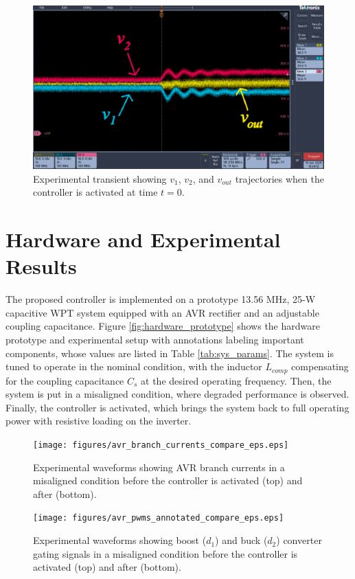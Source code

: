 \documentclass[conference, twocolumn, letterpaper]{IEEEtran}
\begin{document}
\begin{figure}[h]
	\centering
	\includegraphics[width=\linewidth]{figures/avr_voltage_transient_annotated_eps.eps}
	\caption{Experimental transient showing $v_1$, $v_2$, and $v_{out}$ trajectories when the controller is activated at time $t = 0$.}
	\label{fig:voltage_transient}
\end{figure}

\section{Hardware and Experimental Results}
\label{sec:hardware}

The proposed controller is implemented on a prototype 13.56 MHz, 25-W capacitive WPT system equipped with an AVR rectifier and an adjustable coupling capacitance. Figure \ref{fig:hardware_prototype} shows the hardware prototype and experimental setup with annotations labeling important components, whose values are listed in Table \ref{tab:sys_params}. The system is tuned to operate in the nominal condition, with the inductor $L_{comp}$ compensating for the coupling capacitance $C_s$ at the desired operating frequency. Then, the system is put in a misaligned condition, where degraded performance is observed. Finally, the controller is activated, which brings the system back to full operating power with resistive loading on the inverter.

\begin{figure}[ht]
	\centering
	\texttt{[image: figures/avr\_branch\_currents\_compare\_eps.eps]}
	\caption{Experimental waveforms showing AVR branch currents in a misaligned condition before the controller is activated (top) and after (bottom).}
	\label{fig:branch_currents}
\end{figure}

\begin{figure}[!ht]
	\centering
	\texttt{[image: figures/avr\_pwms\_annotated\_compare\_eps.eps]}
	\caption{Experimental waveforms showing boost ($d_1$) and buck ($d_2$) converter gating signals in a misaligned condition before the controller is activated (top) and after (bottom).}
	\label{fig:pwms}
\end{figure}
\end{document}
